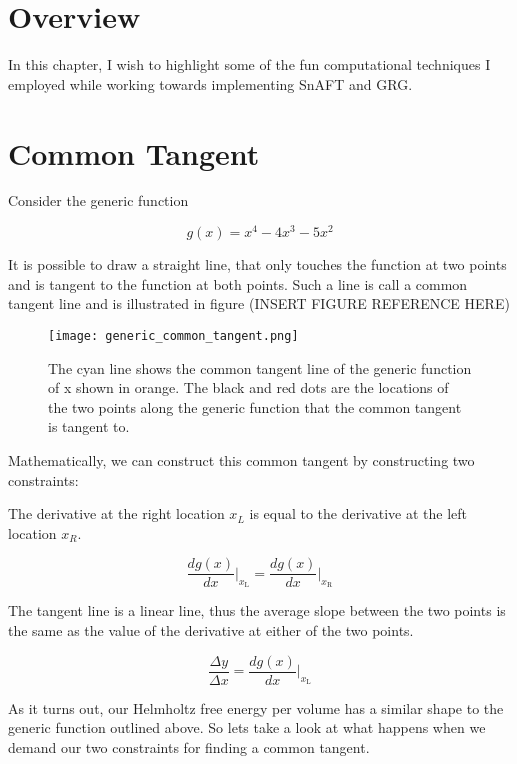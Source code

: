 \section{Overview}

In this chapter, I wish to highlight some of the fun computational techniques I employed while working towards implementing SnAFT and GRG.  


\section{Common Tangent}

Consider the generic function

\begin{equation}
g(x) = x^4 - 4 x^3 - 5 x^2
\end{equation}

It is possible to draw a straight line, that only touches the function at two points and is tangent to the function at both points.  Such a line is call a common tangent line and is illustrated in figure (INSERT FIGURE REFERENCE HERE)


\begin{figure}[h]
	\centering
	\texttt{[image: generic\_common\_tangent.png]}
	\caption{The cyan line shows the common tangent line of the generic function of x shown in orange.  The black and red dots are the locations of the two points along the generic function that the common tangent is tangent to.}
	\label{fig:generic_common_tangent}
\end{figure}

Mathematically, we can construct this common tangent by constructing two constraints:

\quad The derivative at the right location $x_L$ is equal to the derivative at the left location $x_R$.

\begin{equation}
\frac{dg(x)}{dx}\Bigr|_{x_{\text{L}}} = \frac{dg(x)}{dx}\Bigr|_{x_{\text{R}}}
\end{equation}

\quad The tangent line is a linear line, thus the average slope between the two points is the same as the value of the derivative at either of the two points.

\begin{equation}
\frac{\Delta y}{\Delta x} = \frac{dg(x)}{dx}\Bigr|_{x_{\text{L}}}
\end{equation}


As it turns out, our Helmholtz free energy per volume has a similar shape to the generic function outlined above.  So lets take a look at what happens when we demand our two constraints for finding a common tangent.

